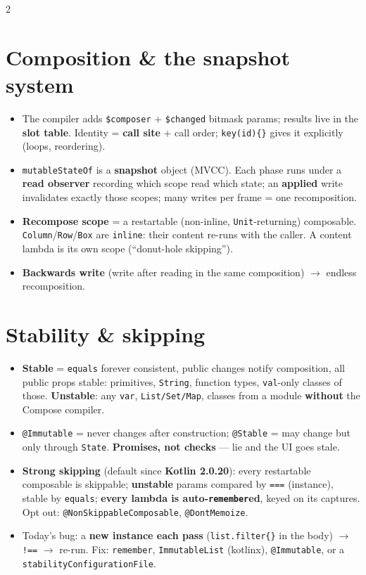 \documentclass[8pt]{extarticle}
\newcommand\eqeqeq{\texttt{\hbox{=}\hbox{=}\hbox{=}}}
\newcommand\neqeq{\texttt{\hbox{!}\hbox{=}\hbox{=}}}
\begin{document}
\begin{multicols}{2}
\raggedright

\section{Composition \& the snapshot system}
\begin{itemize}\raggedright
  \item The compiler adds \texttt{\$composer} + \texttt{\$changed} bitmask params; results live
        in the \textbf{slot table}. Identity = \textbf{call site} + call order;
        \texttt{key(id)\{\}} gives it explicitly (loops, reordering).
  \item \texttt{mutableStateOf} is a \textbf{snapshot} object (MVCC). Each phase runs under a
        \textbf{read observer} recording which scope read which state; an \textbf{applied}
        write invalidates exactly those scopes; many writes per frame = one recomposition.
  \item \textbf{Recompose scope} = a restartable (non-inline, \texttt{Unit}-returning)
        composable. \texttt{Column}/\texttt{Row}/\texttt{Box} are \texttt{inline}: their
        content re-runs with the caller. A content lambda is its own scope
        (``donut-hole skipping'').
  \item \textbf{Backwards write} (write after reading in the same composition) $\to$
        endless recomposition.
\end{itemize}

\section{Stability \& skipping}
\begin{itemize}\raggedright
  \item \textbf{Stable} = \texttt{equals} forever consistent, public changes notify
        composition, all public props stable: primitives, \texttt{String}, function types,
        \texttt{val}-only classes of those. \textbf{Unstable}: any \texttt{var},
        \texttt{List/Set/Map}, classes from a module \textbf{without} the Compose compiler.
  \item \texttt{@Immutable} = never changes after construction; \texttt{@Stable} = may change
        but only through \texttt{State}. \textbf{Promises, not checks} — lie and the UI goes stale.
  \item \textbf{Strong skipping} (default since \textbf{Kotlin 2.0.20}): every restartable
        composable is skippable; \textbf{unstable} params compared by \eqeqeq{} (instance),
        stable by \texttt{equals}; \textbf{every lambda is auto-\texttt{remember}ed}, keyed
        on its captures. Opt out: \texttt{@NonSkippableComposable}, \texttt{@DontMemoize}.
  \item Today's bug: a \textbf{new instance each pass} (\texttt{list.filter\{\}} in the body)
        $\to$ \neqeq{} $\to$ re-run. Fix: \texttt{remember}, \texttt{ImmutableList}
        (kotlinx), \texttt{@Immutable}, or a \texttt{stabilityConfigurationFile}.
\end{itemize}


\end{multicols}
\end{document}
